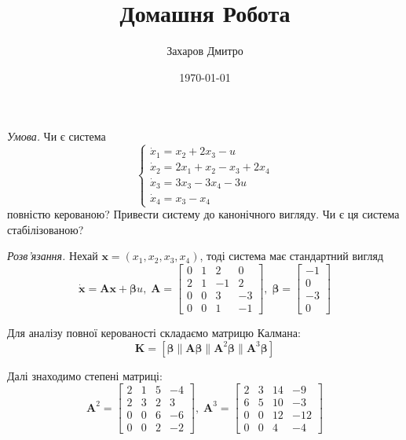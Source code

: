 \documentclass[oneside,solution]{karazin-control-assign}
\title{Домашня Робота}
\author{Захаров Дмитро}
\date{\today}
\begin{document}
\maketitle



\hspace{20px}\textit{Умова.} Чи є система
\begin{equation}
    \begin{cases}
        \dot{x}_1 = x_2 + 2x_3 - u \\
        \dot{x}_2 = 2x_1 + x_2 - x_3 + 2x_4 \\
        \dot{x}_3 = 3x_3 - 3x_4 - 3u \\
        \dot{x}_4 = x_3 - x_4
    \end{cases}
\end{equation}
повністю керованою? Привести систему до канонічного вигляду. Чи є ця система стабілізованою?

\textit{Розв'язання.} Нехай $\mathbf{x}=(x_1,x_2,x_3,x_4)$, тоді система має стандартний вигляд
\begin{equation}
    \dot{\mathbf{x}} = \boldsymbol{A}\mathbf{x} + \boldsymbol{\beta}u, \; \boldsymbol{A} = \begin{bmatrix}
        0 & 1 & 2 & 0 \\
        2 & 1 & -1 & 2 \\
        0 & 0 & 3 & -3 \\
        0 & 0 & 1 & -1 
    \end{bmatrix}, \; \boldsymbol{\beta} = \begin{bmatrix}
        -1 \\ 0 \\ -3 \\ 0
    \end{bmatrix}
\end{equation}

Для аналізу повної керованості складаємо матрицю Калмана:
\begin{equation}
    \boldsymbol{K} = [\boldsymbol{\beta} \parallel \boldsymbol{A\beta} \parallel \boldsymbol{A}^2\boldsymbol{\beta} \parallel \boldsymbol{A}^3\boldsymbol{\beta}]
\end{equation}

Далі знаходимо степені матриці:
\begin{equation}
    \boldsymbol{A}^2 = \begin{bmatrix}
        2 & 1 & 5 & -4 \\
        2 & 3 & 2 & 3 \\
        0 & 0 & 6 & -6 \\
        0 & 0 & 2 & -2
    \end{bmatrix}, \; \boldsymbol{A}^3 = \begin{bmatrix}
        2 & 3 & 14 & -9 \\
        6 & 5 & 10 & -3 \\
        0 & 0 & 12 & -12 \\
        0 & 0 & 4 & -4
    \end{bmatrix}
\end{equation}
\end{document}
